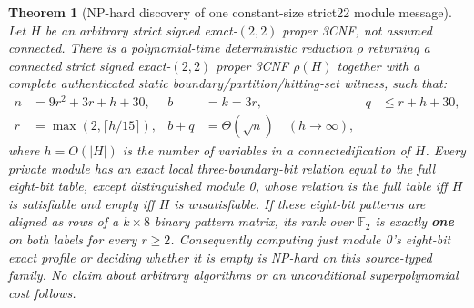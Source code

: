 \documentclass[10pt]{article}
\newtheorem{theorem}{Theorem}
\newcommand{\F}{\mathbb F_2}
\begin{document}
\begin{theorem}[NP-hard discovery of one constant-size strict22 module message]\label{thm:hard}
Let $H$ be an arbitrary strict signed exact-$(2,2)$ proper 3CNF, not assumed connected. There is a polynomial-time deterministic reduction $\rho$ returning a \emph{connected} strict signed exact-$(2,2)$ proper 3CNF $\rho(H)$ together with a complete authenticated static boundary/partition/hitting-set witness, such that:
\begin{align*}
 n&=9r^2+3r+h+30,& b&=k=3r,&q&\le r+h+30,\\
 r&=\max(2,\lceil h/15\rceil),& b+q&=\Theta(\sqrt n)\quad(h\to\infty),&&
\end{align*}
where $h=O(|H|)$ is the number of variables in a connectedification of $H$. Every private module has an exact local three-boundary-bit relation equal to the full eight-bit table, except distinguished module 0, whose relation is the full table iff $H$ is satisfiable and empty iff $H$ is unsatisfiable. If these eight-bit patterns are aligned as rows of a $k\times8$ binary pattern matrix, its rank over $\F$ is exactly \textbf{one} on both labels for every $r\ge2$. Consequently computing just module 0's eight-bit exact profile or deciding whether it is empty is NP-hard on this \emph{source-typed} family. No claim about arbitrary algorithms or an unconditional superpolynomial cost follows.
\end{theorem}
\end{document}
